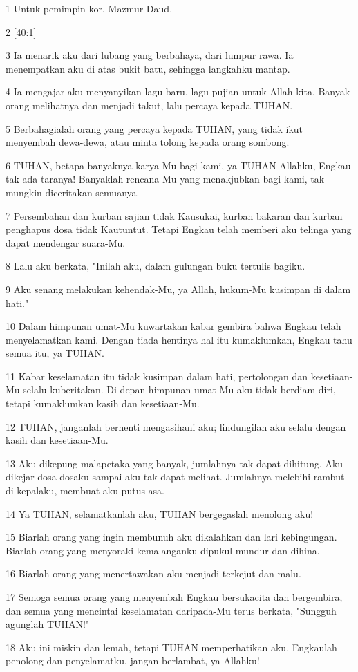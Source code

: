 \par 1 Untuk pemimpin kor. Mazmur Daud.
\par 2 [40:1]
\par 3 Ia menarik aku dari lubang yang berbahaya, dari lumpur rawa. Ia menempatkan aku di atas bukit batu, sehingga langkahku mantap.
\par 4 Ia mengajar aku menyanyikan lagu baru, lagu pujian untuk Allah kita. Banyak orang melihatnya dan menjadi takut, lalu percaya kepada TUHAN.
\par 5 Berbahagialah orang yang percaya kepada TUHAN, yang tidak ikut menyembah dewa-dewa, atau minta tolong kepada orang sombong.
\par 6 TUHAN, betapa banyaknya karya-Mu bagi kami, ya TUHAN Allahku, Engkau tak ada taranya! Banyaklah rencana-Mu yang menakjubkan bagi kami, tak mungkin diceritakan semuanya.
\par 7 Persembahan dan kurban sajian tidak Kausukai, kurban bakaran dan kurban penghapus dosa tidak Kautuntut. Tetapi Engkau telah memberi aku telinga yang dapat mendengar suara-Mu.
\par 8 Lalu aku berkata, "Inilah aku, dalam gulungan buku tertulis bagiku.
\par 9 Aku senang melakukan kehendak-Mu, ya Allah, hukum-Mu kusimpan di dalam hati."
\par 10 Dalam himpunan umat-Mu kuwartakan kabar gembira bahwa Engkau telah menyelamatkan kami. Dengan tiada hentinya hal itu kumaklumkan, Engkau tahu semua itu, ya TUHAN.
\par 11 Kabar keselamatan itu tidak kusimpan dalam hati, pertolongan dan kesetiaan-Mu selalu kuberitakan. Di depan himpunan umat-Mu aku tidak berdiam diri, tetapi kumaklumkan kasih dan kesetiaan-Mu.
\par 12 TUHAN, janganlah berhenti mengasihani aku; lindungilah aku selalu dengan kasih dan kesetiaan-Mu.
\par 13 Aku dikepung malapetaka yang banyak, jumlahnya tak dapat dihitung. Aku dikejar dosa-dosaku sampai aku tak dapat melihat. Jumlahnya melebihi rambut di kepalaku, membuat aku putus asa.
\par 14 Ya TUHAN, selamatkanlah aku, TUHAN bergegaslah menolong aku!
\par 15 Biarlah orang yang ingin membunuh aku dikalahkan dan lari kebingungan. Biarlah orang yang menyoraki kemalanganku dipukul mundur dan dihina.
\par 16 Biarlah orang yang menertawakan aku menjadi terkejut dan malu.
\par 17 Semoga semua orang yang menyembah Engkau bersukacita dan bergembira, dan semua yang mencintai keselamatan daripada-Mu terus berkata, "Sungguh agunglah TUHAN!"
\par 18 Aku ini miskin dan lemah, tetapi TUHAN memperhatikan aku. Engkaulah penolong dan penyelamatku, jangan berlambat, ya Allahku!

